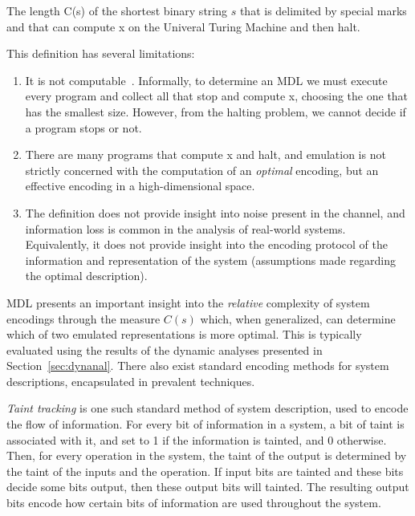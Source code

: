 \begin{definition}
The length C(s) of the shortest binary string $s$ that is delimited by special marks and that can compute x on the Univeral Turing Machine and then halt.
\end{definition}

\noindent
This definition has several limitations:
\begin{enumerate}
	\item It is not computable~\cite{cover1999elements}. Informally, to determine an
		MDL we must execute every program and collect all that stop and
		compute x, choosing the one that has the smallest size.
		However, from the halting problem, we cannot decide if a
		program stops or not. 
	\item There are many programs that compute x and halt, and emulation is
		not strictly concerned with the computation of an
		\emph{optimal} encoding, but an effective encoding in a
		high-dimensional space.
	\item The definition does not provide insight into noise present in the
		channel, and information loss is common in the analysis of real-world
		systems. Equivalently, it does not provide insight into the encoding protocol
		of the information and representation of the system (assumptions made regarding
		the optimal description).
\end{enumerate}

MDL presents an important insight into the \emph{relative} complexity of system encodings through the measure $C(s)$ which, when generalized, can determine which of two emulated representations is more optimal.
This is typically evaluated using the results of the dynamic analyses presented in Section~\ref{sec:dynanal}.
There also exist standard encoding methods for system descriptions, encapsulated in prevalent techniques.

\emph{Taint tracking} is one such standard method of system description, used to encode the flow of information.
For every bit of information in a system, a bit of taint is associated with it, and set to 1 if the information is tainted, and 0 otherwise.
Then, for every operation in the system, the taint of the output is determined by the taint of the inputs and the operation.
If input bits are tainted and these bits decide some bits output, then these output bits will tainted.
The resulting output bits encode how certain bits of information are used throughout the system.

